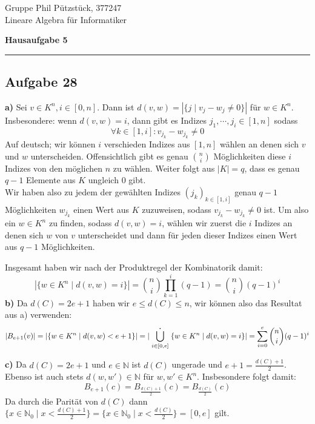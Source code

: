 \documentclass[a4paper,graphics,11pt]{article}
\newcommand{\aufgabe}[1]{\subsection*{Aufgabe #1}}
\newcommand{\up}[2]{\mathrel{\overset{\makebox[0pt]{\mbox{\normalfont\tiny #2}}}{#1}}}
\begin{document}
\noindent Gruppe              \hfill Phil Pützstück, 377247\\
\noindent Lineare Algebra für Informatiker\\
\begin{center}
	\LARGE{\textbf{Hausaufgabe 5}}
\end{center}
\begin{center}
\rule[0.1ex]{\textwidth}{1pt}
\end{center}



\aufgabe{28}
\textbf{a)}
Sei $v \in K^n, i \in [0,n]$. Dann ist $d(v,w) = |\{j \mid v_j - w_j \neq 0\}|$ für $w \in K^n$.\\
Insbesondere: wenn $d(v,w) = i$, dann gibt es Indizes $j_1,\cdots, j_i \in [1,n]$ sodass 
$$
    \forall k \in [1,i] : v_{j_k} - w_{j_k} \neq 0
$$
Auf deutsch; wir können $i$ verschieden Indizes aus $[1,n]$ wählen an denen sich $v$ und $w$ unterscheiden.
Offensichtlich gibt es genau $\binom{n}{i}$ Möglichkeiten diese $i$ Indizes von den möglichen $n$ zu wählen.
Weiter folgt aus $|K| = q$, dass es genau $q-1$ Elemente aus $K$ ungleich 0 gibt.\\
Wir haben also zu jedem der gewählten Indizes $(j_k)_{k \in [1,i]}$ genau $q-1$ Möglichkeiten $w_{j_k}$ einen Wert aus $K$
zuzuweisen, sodass $v_{j_k} - w_{j_k} \neq 0$ ist. Um also ein $w \in K^n$ zu finden, sodass $d(v,w) = i$, wählen
wir zuerst die $i$ Indizes an denen sich $w$ von $v$ unterscheidet und dann für jeden dieser Indizes einen Wert aus
$q-1$ Möglichkeiten.

Insgesamt haben wir nach der Produktregel der Kombinatorik damit:
$$
    |\{w \in K^n \mid d(v,w) = i\}| = \binom{n}{i}\prod_{k = 1}^{i}(q-1) = \binom{n}{i}(q-1)^i
$$
\textbf{b)}
Da $d(C) = 2e + 1$ haben wir $e \leq d(C) \leq n$, wir können also das Resultat aus a) verwenden:
$$
    |B_{e+1}(v)|
    = |\{w \in K^n \mid d(v,w) < e+1\}|
    = |\up{\displaystyle\bigcup_{i \in [0,e]}}{\Large .} \{w \in K^n \mid d(v,w) = i\}|
    = \sum_{i = 0}^{e} \binom{n}{i}(q-1)^i
$$

\textbf{c)}
Da $d(C) = 2e + 1$ und $e \in \mathbb{N}$ ist $d(C)$ ungerade und $e+1 = \frac{d(C)+1}{2}$. \\
Ebenso ist auch stets $d(w,w') \in \mathbb{N}$ für $w,w' \in K^n$. Insbesondere folgt damit:
$$
    B_{e+1}(c)
    = B_{\frac{d(C)+1}{2}}(c)
    = B_{\frac{d(C)}{2}}(c)
$$
Da durch die Parität von $d(C)$ dann
$\{x \in \mathbb{N}_0 \mid x < \frac{d(C)+1}{2}\} = \{x \in \mathbb{N}_0 \mid x < \frac{d(C)}{2}\} = [0,e]$ gilt.
\end{document}

